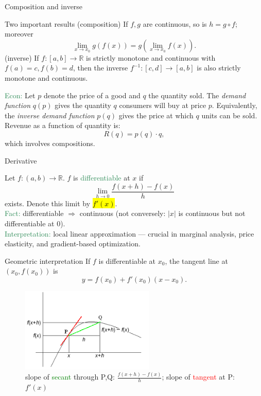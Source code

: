 \documentclass[11pt,aspectratio=169]{beamer}
\begin{document}
\begin{frame}{Composition and inverse}
\begin{alertblock}{Two important results}
(composition) If $f,g$ are continuous, so is $h=g\circ f$; moreover
\[
\lim_{x\to x_0} g(f(x))=g\!\left(\lim_{x\to x_0}f(x)\right).
\]
(inverse)	If $f:[a,b]\to\mathbb{R}$ is strictly monotone and continuous with $f(a)=c,f(b)=d$, then the inverse $f^{-1}:[c,d]\to[a,b]$ is also strictly monotone and continuous.
\end{alertblock}
\textcolor{SeaGreen}{Econ:}  
Let \( p \) denote the price of a good and \( q \) the quantity sold.  
The \emph{demand function} \( q(p) \) gives the quantity \( q \) consumers will buy at price \( p \).  
Equivalently, the \emph{inverse demand function} \( p(q) \) gives the price at which \( q \) units can be sold.  Revenue as a function of quantity is:
\[
R(q) = p(q) \cdot q,
\]
which involves compositions.
\end{frame}

\begin{frame}{Derivative}

Let $f:(a,b) \rightarrow \mathbb{R}$. $f$ is \textcolor{SeaGreen}{differentiable} at $x$ if
\[
\lim_{h \rightarrow 0} \frac{f(x+h)-f(x)}{h}
\]
exists. Denote this limit by \hl{$f'(x)$}.\\[4mm]

\textcolor{SeaGreen}{Fact:} differentiable $\Rightarrow$ continuous (not conversely: $|x|$ is continuous but not differentiable at $0$).\\[4mm]

\textcolor{SeaGreen}{Interpretation:} local linear approximation --- crucial in marginal analysis, price elasticity, and gradient-based optimization.
\end{frame}

\begin{frame}{Geometric interpretation}
If $f$ is differentiable at $x_0$, the tangent line at $(x_0,f(x_0))$ is
\[
y=f(x_0)+f'(x_0)(x-x_0).
\]
\begin{figure}
\includegraphics[width=2.5in]{img/derivative} \\
\small slope of \textcolor{green}{secant} through P,Q: $\frac{f(x+h)-f(x)}{h}$;\quad
slope of \textcolor{red}{tangent} at P: $f'(x)$
\end{figure}
\end{frame}
\end{document}
